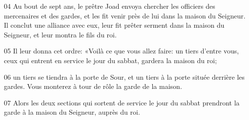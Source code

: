 
04 Au bout de sept ans, le prêtre Joad envoya chercher les officiers des mercenaires et des gardes, et les fit venir près de lui dans la maison du Seigneur. Il conclut une alliance avec eux, leur fit prêter serment dans la maison du Seigneur, et leur montra le fils du roi.

05 Il leur donna cet ordre: «Voilà ce que vous allez faire: un tiers d’entre vous, ceux qui entrent en service le jour du sabbat, gardera la maison du roi;

06 un tiers se tiendra à la porte de Sour, et un tiers à la porte située derrière les gardes. Vous monterez à tour de rôle la garde de la maison.

07 Alors les deux sections qui sortent de service le jour du sabbat prendront la garde à la maison du Seigneur, auprès du roi.
